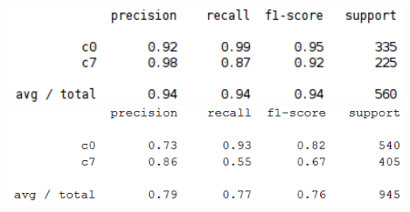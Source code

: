 \documentclass{beamer}
\begin{document}
\begin{frame}
\begin{columns}
\begin{column}{0.3\textwidth}
\begin{center}
			\end{center}
		\end{column}
		\begin{column}{0.7\textwidth}
			\begin{center}
				\includegraphics[width=0.9\textwidth]{handpose_p8_c0+c7_txt}\\
				\vspace{0.2cm}
				\includegraphics[width=0.9\textwidth]{handpose_p20_c0+c7_txt}\\
			\end{center}
		\end{column}
	\end{columns}		
\end{frame}
	
\end{document}
